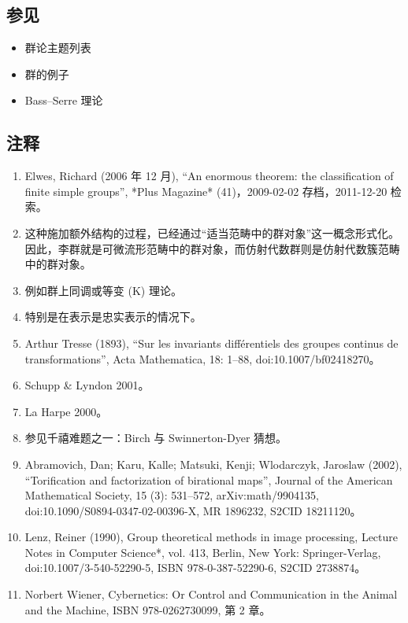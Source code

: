 \subsection{参见}
\begin{itemize}
\item 群论主题列表
\item 群的例子
\item Bass–Serre 理论
\end{itemize}
\subsection{注释}
\begin{enumerate}
\item Elwes, Richard (2006 年 12 月), “An enormous theorem: the classification of finite simple groups”, *Plus Magazine* (41)，2009-02-02 存档，2011-12-20 检索。
\item 这种施加额外结构的过程，已经通过“适当范畴中的群对象”这一概念形式化。因此，李群就是可微流形范畴中的群对象，而仿射代数群则是仿射代数簇范畴中的群对象。
\item 例如群上同调或等变 (K) 理论。
\item 特别是在表示是忠实表示的情况下。
\item Arthur Tresse (1893), “Sur les invariants différentiels des groupes continus de transformations”, Acta Mathematica, 18: 1–88, doi:10.1007/bf02418270。
\item Schupp & Lyndon 2001。
\item La Harpe 2000。
\item 参见千禧难题之一：Birch 与 Swinnerton-Dyer 猜想。
\item Abramovich, Dan; Karu, Kalle; Matsuki, Kenji; Wlodarczyk, Jaroslaw (2002), “Torification and factorization of birational maps”, Journal of the American Mathematical Society, 15 (3): 531–572, arXiv:math/9904135, doi:10.1090/S0894-0347-02-00396-X, MR 1896232, S2CID 18211120。
\item Lenz, Reiner (1990), Group theoretical methods in image processing, Lecture Notes in Computer Science*, vol. 413, Berlin, New York: Springer-Verlag, doi:10.1007/3-540-52290-5, ISBN 978-0-387-52290-6, S2CID 2738874。
\item Norbert Wiener, Cybernetics: Or Control and Communication in the Animal and the Machine, ISBN 978-0262730099, 第 2 章。
\end{enumerate}
